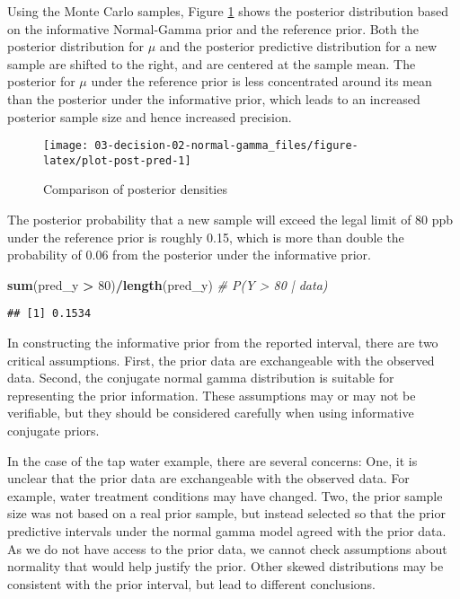 \documentclass[]{book}
\newenvironment{Shaded}{\begin{snugshade}}{\end{snugshade}}
\newcommand{\KeywordTok}[1]{\textcolor[rgb]{0.13,0.29,0.53}{\textbf{#1}}}
\newcommand{\DecValTok}[1]{\textcolor[rgb]{0.00,0.00,0.81}{#1}}
\newcommand{\StringTok}[1]{\textcolor[rgb]{0.31,0.60,0.02}{#1}}
\newcommand{\CommentTok}[1]{\textcolor[rgb]{0.56,0.35,0.01}{\textit{#1}}}
\newcommand{\OperatorTok}[1]{\textcolor[rgb]{0.81,0.36,0.00}{\textbf{#1}}}
\newcommand{\NormalTok}[1]{#1}
\theoremstyle{definition}
\theoremstyle{definition}
\theoremstyle{definition}
\theoremstyle{remark}
\begin{document}
Using the Monte Carlo samples, Figure \ref{fig:plot-post-pred} shows the
posterior distribution based on the informative Normal-Gamma prior and
the reference prior. Both the posterior distribution for \(\mu\) and the
posterior predictive distribution for a new sample are shifted to the
right, and are centered at the sample mean. The posterior for \(\mu\)
under the reference prior is less concentrated around its mean than the
posterior under the informative prior, which leads to an increased
posterior sample size and hence increased precision.

\begin{figure}

{\centering \texttt{[image: 03-decision-02-normal-gamma\_files/figure-latex/plot-post-pred-1]} 

}

\caption{Comparison of posterior densities}\label{fig:plot-post-pred}
\end{figure}

The posterior probability that a new sample will exceed the legal limit
of 80 ppb under the reference prior is roughly 0.15, which is more than
double the probability of 0.06 from the posterior under the informative
prior.

\begin{Shaded}
\begin{Highlighting}[]
\KeywordTok{sum}\NormalTok{(pred_y }\OperatorTok{>}\StringTok{ }\DecValTok{80}\NormalTok{)}\OperatorTok{/}\KeywordTok{length}\NormalTok{(pred_y)  }\CommentTok{# P(Y > 80 | data)}
\end{Highlighting}
\end{Shaded}

\begin{verbatim}
## [1] 0.1534
\end{verbatim}

In constructing the informative prior from the reported interval, there
are two critical assumptions. First, the prior data are exchangeable
with the observed data. Second, the conjugate normal gamma distribution
is suitable for representing the prior information. These assumptions
may or may not be verifiable, but they should be considered carefully
when using informative conjugate priors.

In the case of the tap water example, there are several concerns: One,
it is unclear that the prior data are exchangeable with the observed
data. For example, water treatment conditions may have changed. Two, the
prior sample size was not based on a real prior sample, but instead
selected so that the prior predictive intervals under the normal gamma
model agreed with the prior data. As we do not have access to the prior
data, we cannot check assumptions about normality that would help
justify the prior. Other skewed distributions may be consistent with the
prior interval, but lead to different conclusions.
\end{document}
